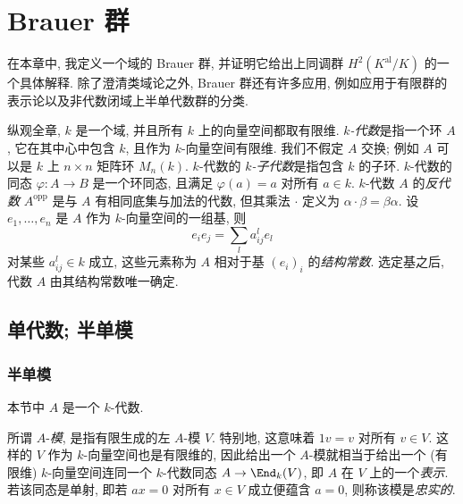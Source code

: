 \chapter{Brauer 群}\label{ch:IV}
\providecommand{\Br}{\operatorname{Br}}

在本章中, 我定义一个域的 Brauer 群, 并证明它给出上同调群 $H^2(K^{\mathrm{al}}/K)$ 的一个具体解释. 除了澄清类域论之外, Brauer 群还有许多应用, 例如应用于有限群的表示论以及非代数闭域上半单代数群的分类.

纵观全章, $k$ 是一个域, 并且所有 $k$ 上的向量空间都取有限维. \emph{$k$-代数}是指一个环 $A$, 它在其中心中包含 $k$, 且作为 $k$-向量空间有限维. 我们不假定 $A$ 交换; 例如 $A$ 可以是 $k$ 上 $n\times n$ 矩阵环 $M_n(k)$. $k$-代数的 \emph{$k$-子代数}是指包含 $k$ 的子环. $k$-代数的同态 $\varphi\colon A\to B$ 是一个环同态, 且满足 $\varphi(a)=a$ 对所有 $a\in k$. $k$-代数 $A$ 的\emph{反代数} $A^{\mathrm{opp}}$ 是与 $A$ 有相同底集与加法的代数, 但其乘法 $\cdot$ 定义为 $\alpha\cdot\beta=\beta\alpha$. 设 $e_1,\ldots,e_n$ 是 $A$ 作为 $k$-向量空间的一组基, 则
\[
e_{i}e_{j}=\sum_{l}a_{ij}^{l}e_{l}
\]
对某些 $a_{ij}^{l}\in k$ 成立, 这些元素称为 $A$ 相对于基 $(e_i)_i$ 的\emph{结构常数}. 选定基之后, 代数 $A$ 由其结构常数唯一确定.

\section{单代数; 半单模}\label{sec:IV.1}

\subsection*{半单模}

本节中 $A$ 是一个 $k$-代数.

所谓 $A$-\emph{模}, 是指有限生成的左 $A$-模 $V$. 特别地, 这意味着 $1v=v$ 对所有 $v\in V$. 这样的 $V$ 作为 $k$-向量空间也是有限维的, 因此给出一个 $A$-模就相当于给出一个 (有限维) $k$-向量空间连同一个 $k$-代数同态 $A\to\End_k(V)$, 即 $A$ 在 $V$ 上的一个\emph{表示}. 若该同态是单射, 即若 $ax=0$ 对所有 $x\in V$ 成立便蕴含 $a=0$, 则称该模是\emph{忠实的}.

